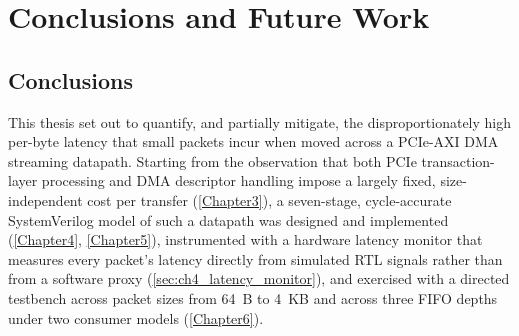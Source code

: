 
\chapter{Conclusions and Future Work}

\label{Chapter8}


\section{Conclusions}
\label{sec:ch8_conclusions}

This thesis set out to quantify, and partially mitigate, the disproportionately high per-byte latency that small packets incur when moved across a PCIe-AXI DMA streaming datapath. Starting from the observation that both PCIe transaction-layer processing and DMA descriptor handling impose a largely fixed, size-independent cost per transfer (\autoref{Chapter3}), a seven-stage, cycle-accurate SystemVerilog model of such a datapath was designed and implemented (\autoref{Chapter4}, \autoref{Chapter5}), instrumented with a hardware latency monitor that measures every packet's latency directly from simulated RTL signals rather than from a software proxy (\autoref{sec:ch4_latency_monitor}), and exercised with a directed testbench across packet sizes from 64~B to 4~KB and across three FIFO depths under two consumer models (\autoref{Chapter6}).

